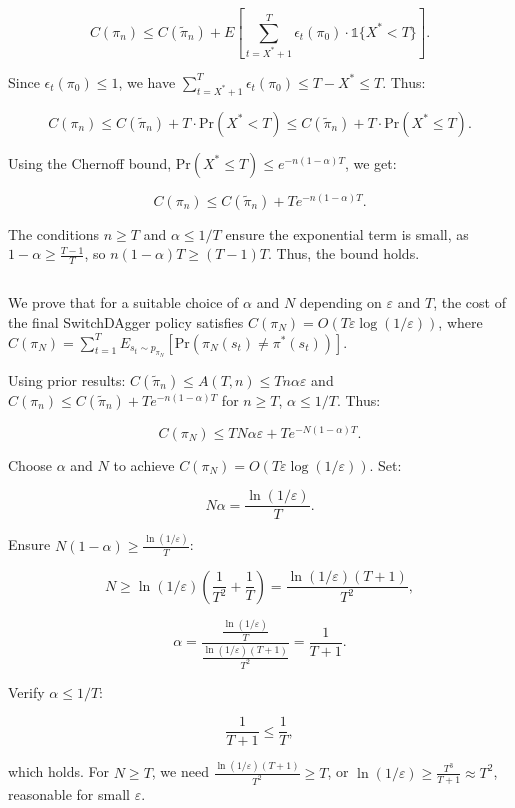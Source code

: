 \documentclass[12pt,oneside]{book}
\begin{document}
\[
C(\pi_n) \leq C(\tilde{\pi}_n) + E\left[ \sum_{t=X^*+1}^T \epsilon_t(\pi_0) \cdot \mathbb{1}\{X^* < T\} \right].
\]

Since \(\epsilon_t(\pi_0) \leq 1\), we have \(\sum_{t=X^*+1}^T \epsilon_t(\pi_0) \leq T - X^* \leq T\). Thus:

\[
C(\pi_n) \leq C(\tilde{\pi}_n) + T \cdot \text{Pr}(X^* < T) \leq C(\tilde{\pi}_n) + T \cdot \text{Pr}(X^* \leq T).
\]

Using the Chernoff bound, \(\text{Pr}(X^* \leq T) \leq e^{-n (1-\alpha)T}\), we get:

\[
C(\pi_n) \leq C(\tilde{\pi}_n) + T e^{-n (1-\alpha)T}.
\]

The conditions \( n \geq T \) and \( \alpha \leq 1/T \) ensure the exponential term is small, as \( 1 - \alpha \geq \frac{T-1}{T} \), so \( n (1 - \alpha) T \geq (T-1)T \). Thus, the bound holds.

\subsection{ }
We prove that for a suitable choice of \(\alpha\) and \(N\) depending on \(\varepsilon\) and \(T\), the cost of the final SwitchDAgger policy satisfies \(C(\pi_N) = O(T \varepsilon \log(1/\varepsilon))\), where \(C(\pi_N) = \sum_{t=1}^T E_{s_t \sim p_{\pi_N}} [\text{Pr}(\pi_N(s_t) \neq \pi^*(s_t))]\).

Using prior results: \(C(\tilde{\pi}_n) \leq A(T, n) \leq T n \alpha \varepsilon\) and \(C(\pi_n) \leq C(\tilde{\pi}_n) + T e^{-n (1-\alpha)T}\) for \(n \geq T\), \(\alpha \leq 1/T\). Thus:

\[
C(\pi_N) \leq T N \alpha \varepsilon + T e^{-N (1-\alpha)T}.
\]

Choose \(\alpha\) and \(N\) to achieve \(C(\pi_N) = O(T \varepsilon \log(1/\varepsilon))\). Set:

\[
N \alpha = \frac{\ln(1/\varepsilon)}{T}.
\]

Ensure \(N (1 - \alpha) \geq \frac{\ln(1/\varepsilon)}{T}\):

\[
N \geq \ln(1/\varepsilon) \left( \frac{1}{T^2} + \frac{1}{T} \right) = \frac{\ln(1/\varepsilon) (T + 1)}{T^2},
\]

\[
\alpha = \frac{\frac{\ln(1/\varepsilon)}{T}}{\frac{\ln(1/\varepsilon) (T + 1)}{T^2}} = \frac{1}{T + 1}.
\]

Verify \(\alpha \leq 1/T\):

\[
\frac{1}{T + 1} \leq \frac{1}{T},
\]

which holds. For \(N \geq T\), we need \(\frac{\ln(1/\varepsilon) (T + 1)}{T^2} \geq T\), or \(\ln(1/\varepsilon) \geq \frac{T^3}{T + 1} \approx T^2\), reasonable for small \(\varepsilon\).
\end{document}
